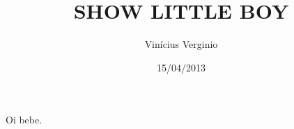 \documentclass{article}
\author{Vinícius Verginio}
\date{15/04/2013}
\title{SHOW LITTLE BOY}
\begin{document}
\maketitle

Oi bebe.
\end{document}
